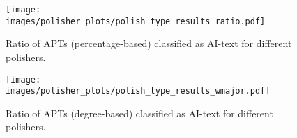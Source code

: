 \begin{figure}[h!]
    \centering
    \texttt{[image: images/polisher\_plots/polish\_type\_results\_ratio.pdf]}
    \caption{Ratio of APTs (percentage-based) classified as AI-text for different polishers.}
    \label{fig:polisher_vary_ratio}
\end{figure}

\begin{figure}[h!]
    \centering
    \texttt{[image: images/polisher\_plots/polish\_type\_results\_wmajor.pdf]}
    \caption{Ratio of APTs (degree-based) classified as AI-text for different polishers.}
    \label{fig:polisher_vary_degree}
\end{figure}